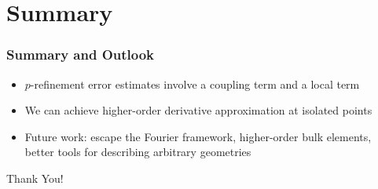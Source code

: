 \documentclass[8pt]{beamer}
\begin{document}
\section{Summary}
\begin{frame}
    \frametitle{Summary and Outlook}
    \begin{itemize}
        \item \(p\)-refinement error estimates involve a coupling term and a
              local term
        \item We can achieve higher-order derivative approximation at isolated
              points
        \item Future work: escape the Fourier framework, higher-order bulk
              elements, better tools for describing arbitrary geometries
    \end{itemize}

    \vspace{0.5in}
    \begin{center}
        \textcolor{Carolinablue}{\Huge Thank You!}
    \end{center}
\end{frame}
\end{document}
